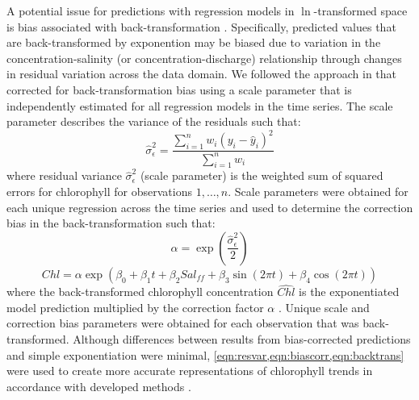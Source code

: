 \documentclass[letterpaper,12pt,oneside]{article}\usepackage[]{graphicx}\usepackage[]{color}
\begin{document}
A potential issue for predictions with regression models in $\ln$-transformed space is bias associated with back-transformation \citep{Duan83}.  Specifically, predicted values that are back-transformed by exponention may be biased due to variation in the concentration-salinity (or concentration-discharge) relationship through changes in residual variation across the data domain.  We followed the approach in \citet{Moyer12} that corrected for back-transformation bias using a scale parameter that is independently estimated for all regression models in the time series.  The scale parameter describes the variance of the residuals such that: 
\begin{equation}\label{eqn:resvar}
\hat{\sigma}_\epsilon^2 =\frac{\sum\limits_{{i = 1}}^n w_i \left(y_i - \hat{y}_i \right)^2}{\sum\limits_{{i = 1}}^n w_i }
\end{equation}
\noindent where residual variance $\hat{\sigma}_\epsilon^2$ (scale parameter) is the weighted sum of squared errors for chlorophyll for observations $1,\ldots,n$.  Scale parameters were obtained for each unique regression across the time series and used to determine the correction bias in the back-transformation such that:
\begin{equation}\label{eqn:biascorr}
\alpha = \exp\left(\frac{\hat{\sigma}_\epsilon^2}{2}\right)
\end{equation}
\begin{equation}\label{eqn:backtrans}
\hat{Chl} = \alpha \exp\left(\beta_0 + \beta_1 t + \beta_2 Sal_{ff} + \beta_3 \sin\left(2\pi t\right) + \beta_4 \cos\left(2\pi t\right)\right)
\end{equation}
\noindent where the back-transformed chlorophyll concentration $\hat{Chl}$ is the exponentiated model prediction multiplied by the correction factor $\alpha$ \citep{Moyer12}.  Unique scale and correction bias parameters were obtained for each observation that was back-transformed.  Although differences between results from bias-corrected predictions and simple exponentiation were minimal, \cref{eqn:resvar,eqn:biascorr,eqn:backtrans} were used to create more accurate representations of chlorophyll trends in accordance with developed methods \citep[i.e.,][]{Hirsch10,Moyer12}. 
\end{document}
